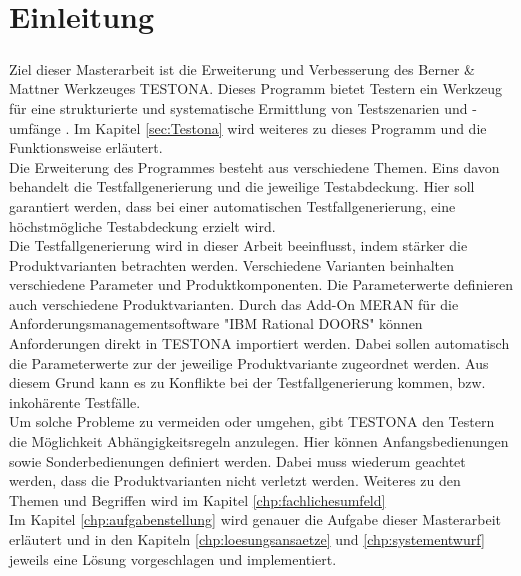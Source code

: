 \chapter{Einleitung}\label{chp:einleitung}
\paragraph{}
Ziel dieser Masterarbeit ist die Erweiterung und Verbesserung des Berner \& Mattner Werkzeuges TESTONA. Dieses Programm bietet Testern ein Werkzeug für eine strukturierte und systematische Ermittlung von Testszenarien und -umfänge \cite{TESTONA}. Im Kapitel \ref{sec:Testona} wird weiteres zu dieses Programm und die Funktionsweise erläutert.\\

Die Erweiterung des Programmes besteht aus verschiedene Themen. Eins davon behandelt die Testfallgenerierung und die jeweilige Testabdeckung. Hier soll garantiert werden, dass bei einer automatischen Testfallgenerierung, eine höchstmögliche Testabdeckung erzielt wird.\\

Die Testfallgenerierung wird in dieser Arbeit beeinflusst, indem stärker die Produktvarianten betrachten werden. Verschiedene Varianten beinhalten verschiedene Parameter und Produktkomponenten. Die Parameterwerte definieren auch verschiedene Produktvarianten. Durch das Add-On MERAN für die Anforderungsmanagementsoftware "IBM Rational DOORS" können Anforderungen direkt in  TESTONA importiert werden. Dabei sollen automatisch die Parameterwerte zur der jeweilige Produktvariante zugeordnet werden. Aus diesem Grund kann es zu Konflikte bei der Testfallgenerierung kommen, bzw. inkohärente Testfälle.\\

Um solche Probleme zu vermeiden oder umgehen, gibt TESTONA den Testern die Möglichkeit Abhängigkeitsregeln anzulegen. Hier können Anfangsbedienungen sowie Sonderbedienungen definiert werden. Dabei muss wiederum geachtet werden, dass die Produktvarianten nicht verletzt werden. Weiteres zu den Themen und Begriffen wird im Kapitel \ref{chp:fachlichesumfeld}\\

Im Kapitel \ref{chp:aufgabenstellung} wird genauer die Aufgabe dieser Masterarbeit erläutert und in den Kapiteln \ref{chp:loesungsansaetze} und \ref{chp:systementwurf} jeweils eine Lösung vorgeschlagen und implementiert.

